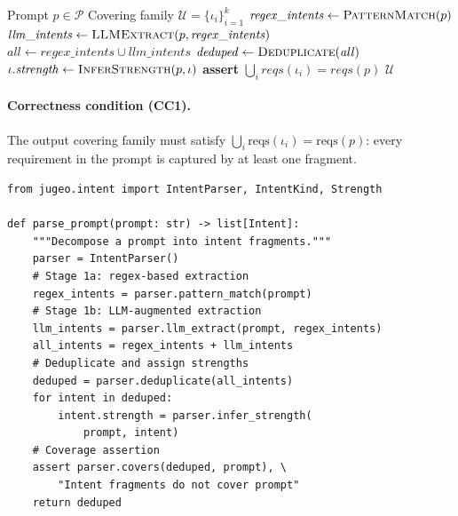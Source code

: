 \documentclass[11pt]{article}
\newcommand{\PromptSpace}{\mathcal{P}}
\newcommand{\IntentFrag}{\iota}
\newcommand{\CoverFam}{\mathcal{U}}
\newcommand{\IntentParse}{\textsc{IntentParse}}
\begin{document}
\begin{algorithm}[t]
\caption{\IntentParse: Prompt decomposition}\label{alg:intent-parse}
\begin{algorithmic}[1]
\REQUIRE Prompt $p \in \PromptSpace$
\ENSURE Covering family $\CoverFam = \{\IntentFrag_i\}_{i=1}^{k}$
\STATE $\mathit{regex\_intents} \leftarrow \textsc{PatternMatch}(p)$
\STATE $\mathit{llm\_intents} \leftarrow \textsc{LLMExtract}(p, \mathit{regex\_intents})$
\STATE $\mathit{all} \leftarrow \mathit{regex\_intents} \cup \mathit{llm\_intents}$
\STATE $\mathit{deduped} \leftarrow \textsc{Deduplicate}(\mathit{all})$
\FOR{$\IntentFrag \in \mathit{deduped}$}
  \STATE $\IntentFrag.\mathit{strength} \leftarrow \textsc{InferStrength}(p, \IntentFrag)$
\ENDFOR
\STATE \textbf{assert} $\bigcup_i \mathit{reqs}(\IntentFrag_i) = \mathit{reqs}(p)$
\RETURN $\CoverFam$
\end{algorithmic}
\end{algorithm}

\paragraph{Correctness condition (CC1).}
The output covering family must satisfy
$\bigcup_{i} \mathrm{reqs}(\IntentFrag_i) = \mathrm{reqs}(p)$: every
requirement in the prompt is captured by at least one fragment.

\begin{lstlisting}[caption={Intent parsing implementation.},label={lst:intent-parse}]
from jugeo.intent import IntentParser, IntentKind, Strength

def parse_prompt(prompt: str) -> list[Intent]:
    """Decompose a prompt into intent fragments."""
    parser = IntentParser()
    # Stage 1a: regex-based extraction
    regex_intents = parser.pattern_match(prompt)
    # Stage 1b: LLM-augmented extraction
    llm_intents = parser.llm_extract(prompt, regex_intents)
    all_intents = regex_intents + llm_intents
    # Deduplicate and assign strengths
    deduped = parser.deduplicate(all_intents)
    for intent in deduped:
        intent.strength = parser.infer_strength(
            prompt, intent)
    # Coverage assertion
    assert parser.covers(deduped, prompt), \
        "Intent fragments do not cover prompt"
    return deduped
\end{lstlisting}

\end{document}
